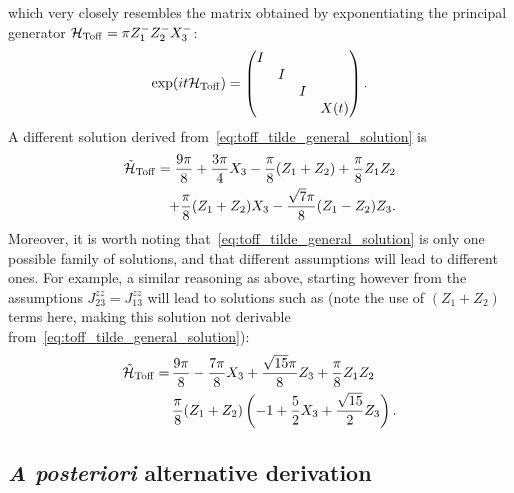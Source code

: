 which very closely resembles the matrix obtained by exponentiating the principal generator
$\mathcal H_{\operatorname{Toff}} = \pi Z_1^- Z_2^- X_3^-$:
\begin{equation}
	\exp(i t \mathcal H_{\operatorname{Toff}}) =
	\begin{pmatrix}
		I & & & \\
		& I & & \\
		& & I & \\
		& & & X(t)
	\end{pmatrix}.
\end{equation}
A different solution derived from~\cref{eq:toff_tilde_general_solution} is
\begin{equation}
\begin{aligned}
	\tilde{\mathcal H}_{\operatorname{Toff}} =
	\frac{9\pi}{8} + \frac{3\pi}{4} X_3 - \frac{\pi}{8} (Z_1 + Z_2)
	+ \frac{\pi}{8} Z_1 Z_2 \\
	+ \frac{\pi}{8} (Z_1 + Z_2) X_3
	- \frac{\sqrt7 \pi}{8} (Z_1 - Z_2) Z_3.
\end{aligned}
\end{equation}
Moreover, it is worth noting that~\cref{eq:toff_tilde_general_solution} is only one possible family of solutions, and that different assumptions will lead to different ones.
For example, a similar reasoning as above, starting however from the assumptions $J_{23}^{zz}=J_{13}^{zz}$ will lead to solutions such as (note the use of $(Z_1+Z_2)$ terms here, making this solution not derivable from~\cref{eq:toff_tilde_general_solution}):
\begin{equation}
\begin{aligned}
	\tilde{{\mathcal{H}}}_{\operatorname{Toff}}{} =\,
		&\frac{9\pi}{8} - \frac{7\pi}{8}X_3 + \frac{\sqrt{15}\pi}{8} Z_3 + \frac{\pi}{8}Z_1 Z_2 \\
		&\frac{\pi}{8}(Z_1+Z_2)\left(-1+\frac{5}{2}X_3 + \frac{\sqrt{15}}{2}Z_3\right).
\end{aligned}
\end{equation}

\subsection{\textit{A posteriori} alternative derivation}
\label{sec:GL:toffoli_posteriori_derivation}

